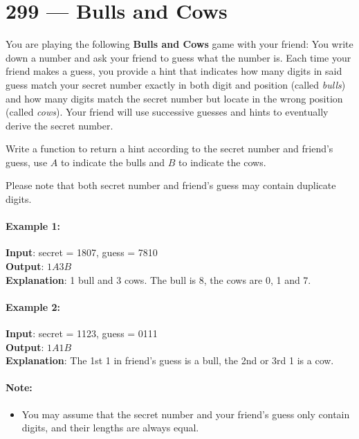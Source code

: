 \section{299 --- Bulls and Cows}
You are playing the following \textbf{Bulls and Cows} game with your friend: You write down a number and ask your friend to guess what the number is. Each time your friend makes a guess, you provide a hint that indicates how many digits in said guess match your secret number exactly in both digit and position (called \textit{bulls}) and how many digits match the secret number but locate in the wrong position (called \textit{cows}). Your friend will use successive guesses and hints to eventually derive the secret number.
\par
Write a function to return a hint according to the secret number and friend's guess, use $A$ to indicate the bulls and $B$ to indicate the cows. 
\par

Please note that both secret number and friend's guess may contain duplicate digits.

\paragraph{Example 1:}

\begin{flushleft}
\textbf{Input}: secret = 1807, guess = 7810
\\
\textbf{Output}: $1A3B$
\\
\textbf{Explanation}: 1 bull and 3 cows. The bull is 8, the cows are 0, 1 and 7.
\end{flushleft}

\paragraph{Example 2:}

\begin{flushleft}
\textbf{Input}: secret = 1123, guess = 0111
\\
\textbf{Output}: $1A1B$
\\
\textbf{Explanation}: The 1st 1 in friend's guess is a bull, the 2nd or 3rd 1 is a cow.
\end{flushleft}

\paragraph{Note:} 
\begin{itemize}
\item You may assume that the secret number and your friend's guess only contain digits, and their lengths are always equal.
\end{itemize}
